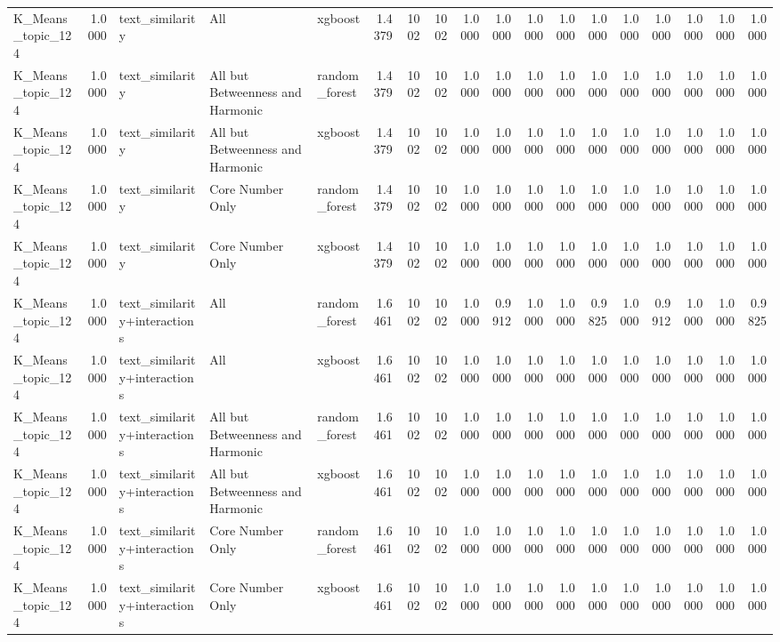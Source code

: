 \begin{tabular}{lrlllrrrrrrrrrrrrr}
K_Means_topic_124 & 1.0000 & text_similarity & All & xgboost & 1.4379 & 1002 & 1002 & 1.0000 & 1.0000 & 1.0000 & 1.0000 & 1.0000 & 1.0000 & 1.0000 & 1.0000 & 1.0000 & 1.0000 \\
K_Means_topic_124 & 1.0000 & text_similarity & All but Betweenness and Harmonic & random_forest & 1.4379 & 1002 & 1002 & 1.0000 & 1.0000 & 1.0000 & 1.0000 & 1.0000 & 1.0000 & 1.0000 & 1.0000 & 1.0000 & 1.0000 \\
K_Means_topic_124 & 1.0000 & text_similarity & All but Betweenness and Harmonic & xgboost & 1.4379 & 1002 & 1002 & 1.0000 & 1.0000 & 1.0000 & 1.0000 & 1.0000 & 1.0000 & 1.0000 & 1.0000 & 1.0000 & 1.0000 \\
K_Means_topic_124 & 1.0000 & text_similarity & Core Number Only & random_forest & 1.4379 & 1002 & 1002 & 1.0000 & 1.0000 & 1.0000 & 1.0000 & 1.0000 & 1.0000 & 1.0000 & 1.0000 & 1.0000 & 1.0000 \\
K_Means_topic_124 & 1.0000 & text_similarity & Core Number Only & xgboost & 1.4379 & 1002 & 1002 & 1.0000 & 1.0000 & 1.0000 & 1.0000 & 1.0000 & 1.0000 & 1.0000 & 1.0000 & 1.0000 & 1.0000 \\
K_Means_topic_124 & 1.0000 & text_similarity+interactions & All & random_forest & 1.6461 & 1002 & 1002 & 1.0000 & 0.9912 & 1.0000 & 1.0000 & 0.9825 & 1.0000 & 0.9912 & 1.0000 & 1.0000 & 0.9825 \\
K_Means_topic_124 & 1.0000 & text_similarity+interactions & All & xgboost & 1.6461 & 1002 & 1002 & 1.0000 & 1.0000 & 1.0000 & 1.0000 & 1.0000 & 1.0000 & 1.0000 & 1.0000 & 1.0000 & 1.0000 \\
K_Means_topic_124 & 1.0000 & text_similarity+interactions & All but Betweenness and Harmonic & random_forest & 1.6461 & 1002 & 1002 & 1.0000 & 1.0000 & 1.0000 & 1.0000 & 1.0000 & 1.0000 & 1.0000 & 1.0000 & 1.0000 & 1.0000 \\
K_Means_topic_124 & 1.0000 & text_similarity+interactions & All but Betweenness and Harmonic & xgboost & 1.6461 & 1002 & 1002 & 1.0000 & 1.0000 & 1.0000 & 1.0000 & 1.0000 & 1.0000 & 1.0000 & 1.0000 & 1.0000 & 1.0000 \\
K_Means_topic_124 & 1.0000 & text_similarity+interactions & Core Number Only & random_forest & 1.6461 & 1002 & 1002 & 1.0000 & 1.0000 & 1.0000 & 1.0000 & 1.0000 & 1.0000 & 1.0000 & 1.0000 & 1.0000 & 1.0000 \\
K_Means_topic_124 & 1.0000 & text_similarity+interactions & Core Number Only & xgboost & 1.6461 & 1002 & 1002 & 1.0000 & 1.0000 & 1.0000 & 1.0000 & 1.0000 & 1.0000 & 1.0000 & 1.0000 & 1.0000 & 1.0000 \\
\bottomrule
\end{tabular}
